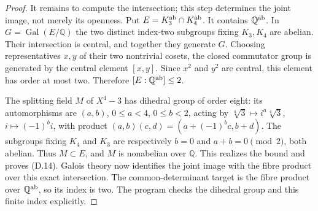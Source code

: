 \begin{proof}
It remains to compute the intersection; this step determines the joint image, not merely its openness. Put $E=K_3^{\rm ab}\cap K_4^{\rm ab}$. It contains $\mathbb Q^{\rm ab}$. In $G=\operatorname{Gal}(E/\mathbb Q)$ the two distinct index-two subgroups fixing $K_3,K_4$ are abelian. Their intersection is central, and together they generate $G$. Choosing representatives $x,y$ of their two nontrivial cosets, the closed commutator group is generated by the central element $[x,y]$. Since $x^2$ and $y^2$ are central, this element has order at most two. Therefore $[E:\mathbb Q^{\rm ab}]\leq2$.

The splitting field $M$ of $X^4-3$ has dihedral group of order eight: its automorphisms are $(a,b)$, $0\leq a<4$, $0\leq b<2$, acting by $\sqrt[4]3\mapsto i^a\sqrt[4]3$, $i\mapsto(-1)^b i$, with product $(a,b)(c,d)=(a+(-1)^bc,b+d)$. The subgroups fixing $K_4$ and $K_3$ are respectively $b=0$ and $a+b=0\pmod2$, both abelian. Thus $M\subset E$, and $M$ is nonabelian over $\mathbb Q$. This realizes the bound and proves (D.14). Galois theory now identifies the joint image with the fibre product over this exact intersection. The common-determinant target is the fibre product over $\mathbb Q^{\rm ab}$, so its index is two. The program checks the dihedral group and this finite index explicitly.
\end{proof}

